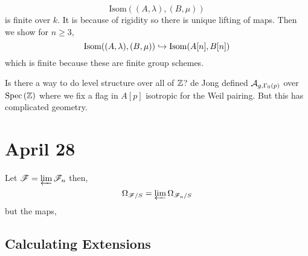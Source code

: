 \documentclass[12pt]{article}
\begin{document}
\begin{rmk}
\[ \mathrm{Isom}((A, \lambda), (B, \mu)) \]
is finite \etale over $k$. It is \etale because of rigidity so there is unique lifting of maps. Then we show for $n \ge 3$,
\[ \mathrm{Isom}((A, \lambda), (B, \mu))  \hookrightarrow \mathrm{Isom}(A[n], B[n]) \]
which is finite because these are finite group schemes.
\end{rmk}

\begin{rmk}
Is there a way to do level structure over all of $\mathbb{Z}$? de Jong defined $\mathcal{A}_{g, \Gamma_0(p)}$ over $\mathrm{Spec}\left( \mathbb{Z} \right)$ where we fix a flag in $A[p]$ isotropic for the Weil pairing. But this has complicated geometry.  
\end{rmk}

\section{April 28}

Let $\mathscr{F} = \varprojlim \mathscr{F}_n$ then,
\[  \Omega_{\mathscr{F} / S} = \varprojlim \Omega_{\mathscr{F}_n/S} \]
but the maps,
\begin{center}
\end{center}

\subsection{Calculating Extensions}
\end{document}
